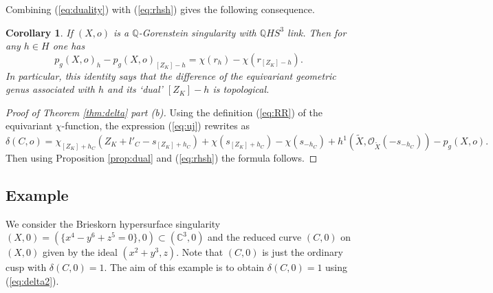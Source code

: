 \documentclass[12pt,a4paper]{amsart}
\newtheorem{cor}{Corollary}[section]
\theoremstyle{remark}
\theoremstyle{definition}
\begin{document}
Combining (\ref{eq:duality}) with (\ref{eq:rhsh}) gives the following consequence. 
\begin{cor}\label{cor:3.5}
If $(X,o)$ is a $\mathbb{Q}$-Gorenstein singularity with $\mathbb{Q}HS^3$ link. Then for any $h\in H$ one has 
\begin{equation}\label{eq:pgdual}
p_g(X,o)_h-p_g(X,o)_{[Z_K]-h}=\chi(r_h)-\chi(r_{[Z_K]-h}).
\end{equation}
In particular, this identity says that the difference of the equivariant geometric genus associated with $h$ and its `dual' $[Z_K]-h$ is topological.
\end{cor}
\vspace{0.1cm}
\begin{proof}[Proof of Theorem \ref{thm:delta} part {\it (b)}]
Using the definition (\ref{eq:RR}) of the equivariant $\chi$-function, the expression (\ref{eq:uj})
rewrites as 
$$\delta(C,o)=\chi_{[Z_K]+h_C}(Z_K+l'_C-s_{[Z_K]+h_C})+\chi(s_{[Z_K]+h_C})-\chi(s_{-h_C})+h^1(\tilde X,\mathcal O_{\tilde X}(-s_{-h_C}))-p_g(X,o).$$
Then using Proposition \ref{prop:dual} and (\ref{eq:rhsh}) the formula follows.
\end{proof}

\subsection{Example}
We consider the Brieskorn hypersurface singularity $(X,0)=(\{x^4-y^6+z^5=0\},0)\subset (\mathbb{C}^3,0)$ and the reduced curve $(C,0)$ on 
$(X,0)$ given  by the ideal $(x^2+y^3,z)$. Note that $(C,0)$ is just the ordinary cusp with $\delta(C,0)=1$. The aim of this example is to obtain  $\delta(C,0)=1$ using  (\ref{eq:delta2}). 
\end{document}
